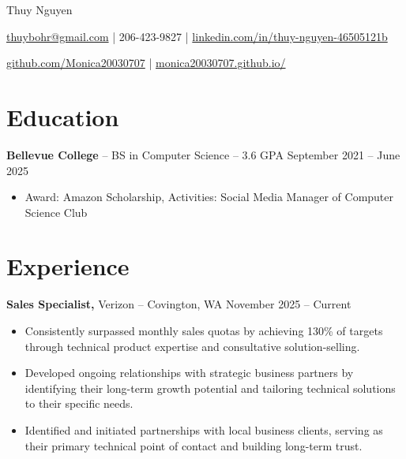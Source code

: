 \documentclass[11pt]{article}       %
\begin{document}
\centerline{\Huge Thuy Nguyen}

\vspace{5pt}

\centerline{\href{mailto:thuybohr@gmail.com}{thuybohr@gmail.com} | 206-423-9827 |
\href{https://www.linkedin.com/in/thuy-nguyen-46505121b/}{linkedin.com/in/thuy-nguyen-46505121b}}

\centerline{\href{https://github.com/Monica20030707}{github.com/Monica20030707} | 
\href{https://monica20030707.github.io/}{monica20030707.github.io/}} 

\vspace{-9pt}

\section*{Education}
\textbf{Bellevue College} -- BS in Computer Science -- 3.6 GPA \hfill September 2021 -- June 2025\\
\vspace{-9pt}
\begin{itemize}
  \item Award: Amazon Scholarship, Activities: Social Media Manager of Computer Science Club
\end{itemize}

\vspace{-18.5pt}

\section*{Experience}

\textbf{Sales Specialist,} {Verizon} -- Covington, WA \hfill November 2025 -- Current \\
\vspace{-9pt}
\begin{itemize}
  \item Consistently surpassed monthly sales quotas by achieving 130\% of targets through technical product expertise and consultative solution-selling.
  \item Developed ongoing relationships with strategic business partners by identifying their long-term growth potential and tailoring technical solutions to their specific needs.
  \item Identified and initiated partnerships with local business clients, serving as their primary technical point of contact and building long-term trust.
\end{itemize}
\end{document}
